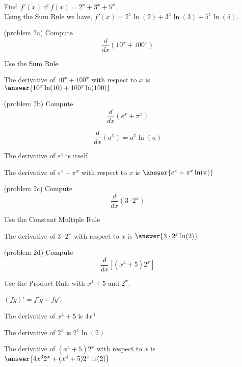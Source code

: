 \documentclass[handout]{ximera}
\begin{document}
\begin{example}[example 2]
 Find $f'(x)$ if $f(x) = 2^x + 3^x + 5^x.$\\
Using the Sum Rule we have, $f'(x) = 2^x\ln(2) + 3^x\ln(3) + 5^x\ln(5)$.
\end{example}


\begin{problem}(problem 2a)
  Compute 
  \[
  \frac{d}{dx} \left(10^x + 100^x\right)
  \]
  
    \begin{hint}
      Use the Sum Rule
    \end{hint}    
		The derivative of $10^x + 100^x$ with respect to $x$ is
		 $\answer{10^x \ln(10) + 100^x \ln(100)}$
	
\end{problem}

\begin{problem}(problem 2b)
  Compute 
  \[
  \frac{d}{dx} \left(e^x + \pi^x\right)
  \]
  
    \begin{hint}
      \[
      \frac{d}{dx} \left(a^x\right) = a^x \ln(a)
      \]
    \end{hint}
		\begin{hint}
		  The derivative of $e^x$ is itself
		\end{hint}
		The derivative of $e^x + \pi^x$ with respect to $x$ is
		 $\answer{e^x  + \pi^x \ln(\pi)}$
	
\end{problem}


\begin{problem}(problem 2c)
  Compute 
  \[
  \frac{d}{dx} \left(3\cdot 2^x\right)
  \]
    
    \begin{hint}
		  Use the Constant Multiple Rule
		\end{hint}
    
		
		The derivative of $3\cdot 2^x$ with respect to $x$ is
		 $\answer{3\cdot 2^x \ln(2)}$
	
\end{problem}



\begin{problem}(problem 2d)
  Compute
  \[
  \frac{d}{dx} \left[(x^4 + 5)2^x\right]
  \]
  
    \begin{hint}
      Use the Product Rule with $x^4 + 5$ and $2^x$.
    \end{hint}
    \begin{hint}
      $(fg)' = f'g+fg'$.
    \end{hint}
    \begin{hint}
      The derivative of $x^4 + 5$ is $4x^3$
    \end{hint}
    \begin{hint}
      The derivative of $2^x$ is $2^x \ln(2)$
    \end{hint}
		The derivative of $(x^4 + 5)2^x$ with respect to $x$ is
		 $\answer{4x^3 2^x + (x^4 + 5) 2^x \ln(2)}$
		
\end{problem}
\end{document}
